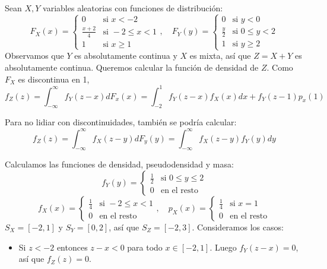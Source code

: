 \begin{example}
    Sean $X, Y$ variables aleatorias con funciones de distribución:
    $$F_X(x) = \begin{cases}
            0             & \text{si } x < -2        \\
            \frac{x+2}{4} & \text{si } -2 \leq x < 1 \\
            1             & \text{si } x \geq 1
        \end{cases}, \quad
        F_Y(y) = \begin{cases}
            0           & \text{si } y < 0        \\
            \frac{y}{2} & \text{si } 0 \leq y < 2 \\
            1           & \text{si } y \geq 2
        \end{cases}$$
    Observamos que $Y$ es absolutamente continua y $X$ es mixta, así que $Z = X+Y$ es absolutamente continua.
    Queremos calcular la función de densidad de $Z$.
    Como $F_X$ es discontinua en 1,
    $$f_Z(z) = \int_{-\infty}^\infty f_Y(z-x) dF_x(x) = \int_{-2}^1 f_Y(z-x) f_X(x) dx + f_Y(z-1)p_x(1)$$
    \begin{note}
        Para no lidiar con discontinuidades, también se podría calcular:
        $$f_Z(z) = \int_{-\infty}^\infty f_X(z-y) dF_y(y) = \int_{-\infty}^\infty f_X(z-y) f_Y(y) dy$$
    \end{note}
    Calculamos las funciones de densidad, pseudodensidad y masa:
    $$f_Y(y) = \begin{cases}
            \frac{1}{2} & \text{si } 0 \leq y \leq 2 \\
            0           & \text{en el resto}
        \end{cases}$$
    $$f_X(x) = \begin{cases}
            \frac{1}{4} & \text{si } -2 \leq x < 1 \\
            0           & \text{en el resto}
        \end{cases}, \quad
        p_X(x) = \begin{cases}
            \frac{1}{4} & \text{si } x = 1   \\
            0           & \text{en el resto}
        \end{cases}$$
    $S_X = [-2, 1]$ y $S_Y = [0, 2]$, así que $S_Z = [-2, 3]$.
    Consideramos los casos:
    \begin{itemize}
        \item Si $z < -2$ entonces $z-x < 0$ para todo $x \in [-2, 1]$.
              Luego $f_Y(z-x) = 0$, así que $f_Z(z) = 0$.

\end{itemize}
\end{example}

